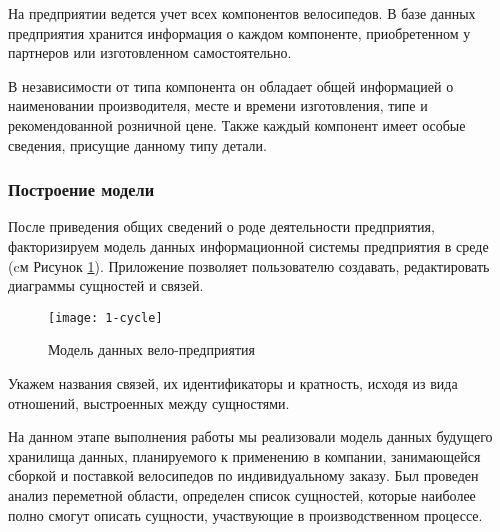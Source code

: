 На предприятии ведется учет всех компонентов велосипедов.
В базе данных предприятия хранится информация о каждом компоненте, приобретенном у партнеров или изготовленном самостоятельно.

В независимости от типа компонента он обладает общей информацией о наименовании производителя, месте и времени изготовления, типе и рекомендованной розничной цене. 
Также каждый компонент имеет особые сведения, присущие данному типу детали.

\subsubsection*{Построение модели}
После приведения общих сведений о роде деятельности предприятия, факторизируем модель данных информационной системы предприятия в среде \erassistant (cм Рисунок \ref{fig:1-cycle}). Приложение \erassistant позволяет пользователю создавать, редактировать диаграммы сущностей и связей.
\begin{figure}[ht]
	\centering
	\texttt{[image: 1-cycle]}
	\caption{Модель данных вело-предприятия}
	\label{fig:1-cycle}
\end{figure}

Укажем названия связей, их идентификаторы и кратность, исходя из вида отношений, выстроенных между сущностями.

На данном этапе выполнения работы мы реализовали модель данных будущего хранилища данных, планируемого к применению в компании, занимающейся сборкой и поставкой велосипедов по индивидуальному заказу. Был проведен анализ переметной области, определен список сущностей, которые наиболее полно смогут описать сущности, участвующие в производственном процессе.
